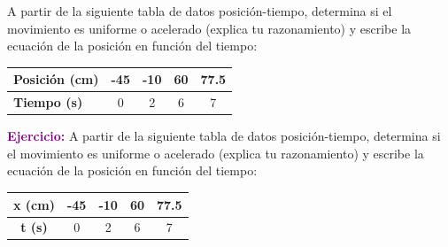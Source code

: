 \begin{exercise}
    A partir de la siguiente tabla de datos posición-tiempo, determina si el movimiento es uniforme o acelerado (explica tu razonamiento) y escribe la ecuación de la posición en función del tiempo:
    \begin{table}[H]
        \centering
        \renewcommand{\arraystretch}{1.5}
        \begin{tabular}{Occcc}
            \bottomrule
            \textcolor{ocre}{\textbf{Posición (\unit{\centi\metre})}} & -45 & -10 & 60 & 77.5 \\
            \hline
            \textcolor{ocre}{\textbf{Tiempo (\unit{\s})}}               & 0   & 2   & 6  & 7    \\
            \toprule
        \end{tabular}
        \label{tab:ejercicio3}
    \end{table}
%

    \begin{solu}
        \textbf{\textcolor{purple}{Ejercicio:}} A partir de la siguiente tabla de datos posición-tiempo, determina si el movimiento es uniforme o acelerado (explica tu razonamiento) y escribe la ecuación de la posición en función del tiempo:
        \begin{center}
            \begin{tabular}{@{}ccccc@{}}
                \toprule
                \textbf{x (cm)} & \textbf{-45} & \textbf{-10} & \textbf{60} & \textbf{77.5} \\
                \midrule
                \textbf{t (s)} & 0 & 2 & 6 & 7 \\
                \bottomrule
            \end{tabular}
        \end{center}


\end{solu}
\end{exercise}
